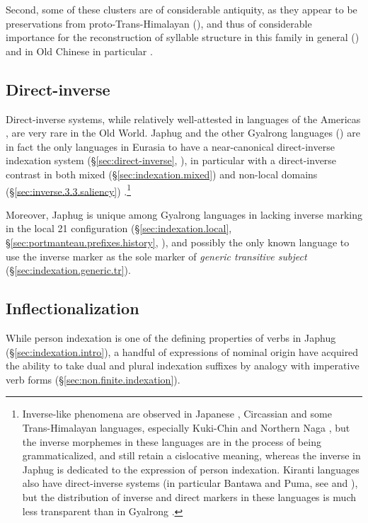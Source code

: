  Second, some of these clusters are of considerable antiquity, as they appear to be preservations from proto-Trans-Himalayan (\citealt{jacques15sr,zhangsy19cognates}), and thus of considerable importance for the reconstruction of syllable structure in this family in general (\citealt[212]{hill2019phonology}) and in Old Chinese in particular \citep{gong17clusters}.
 
\subsection{Direct-inverse}
 
Direct-inverse systems, while relatively well-attested in languages of the Americas \citep{zuniga06}, are very rare in the Old World. Japhug and the other Gyalrong languages (\citealt{delancey81direction, jackson02rentongdengdi, jacques10inverse, gongxun14agreement}) are in fact the only languages in Eurasia to have a near-canonical direct-inverse indexation system (§\ref{sec:direct-inverse}, \citealt{jacques14inverse}), in particular with a direct-inverse contrast in both mixed (§\ref{sec:indexation.mixed}) and non-local domains (§\ref{sec:inverse.3.3.saliency})
.\footnote{Inverse-like phenomena are observed in Japanese \citep{koga2008}, Circassian \citep{arkadiev17inverse} and some Trans-Himalayan languages, especially Kuki-Chin and Northern Naga \citep{konnerth19agreement}, but the inverse morphemes in these languages are in the process of being grammaticalized, and still retain a cislocative meaning, whereas the inverse  in Japhug is dedicated to the expression of person indexation.  Kiranti languages also have direct-inverse systems (in particular Bantawa and Puma, see \citealt{doornenbal09} and \citealt{bickel07puma}), but the distribution of inverse and direct markers in these languages is much less transparent than in Gyalrong \citep{jacques14inverse}.   }

Moreover, Japhug is unique among Gyalrong languages in lacking inverse marking in the local 2\fl{}1 configuration (§\ref{sec:indexation.local}, §\ref{sec:portmanteau.prefixes.history}, \citealt{jacques18generic}),  and possibly the only known language to use the inverse marker as the sole marker of \textit{generic transitive subject}  (§\ref{sec:indexation.generic.tr}). 
  
 
\subsection{Inflectionalization} \label{sec:inflectionalization.intro}
While person indexation is one of the defining properties of verbs in Japhug (§\ref{sec:indexation.intro}), a handful of expressions of nominal origin have acquired the ability to take dual  and plural  indexation suffixes by analogy with imperative verb forms (§\ref{sec:non.finite.indexation}). 

